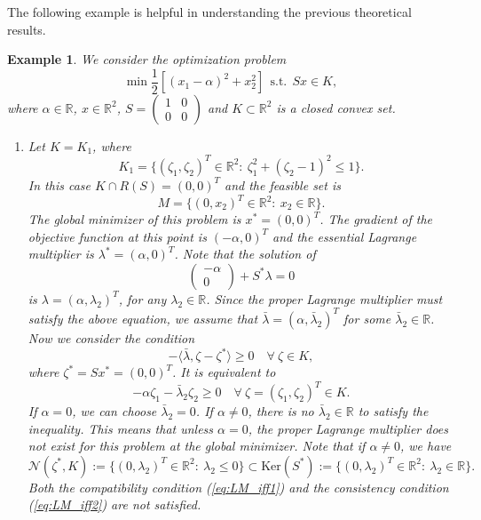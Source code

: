 \documentclass[leqno]{amsart}
\newtheorem{Example}[Theorem]{Example}
\theoremstyle{definition}
\begin{document}
The following example is helpful in understanding the previous theoretical results.
\begin{Example}\label{exm:Ex1}
We consider the optimization problem
\begin{equation}\nonumber
\min\frac{1}{2}[(x_1 -\alpha)^2 + x_2^2]\ \ \mbox{s.t.}\ \  Sx \in K,
\end{equation}
where $\alpha\in \mathbb{R}$, $x\in \mathbb{R}^{2}$, $S = \begin{pmatrix}1 & 0\\ 0 &0 \end{pmatrix}$ and $K\subset \mathbb{R}^2$ is a closed convex set.

\begin{enumerate}[$\bullet$]
\item Let $K = K_1$, where 
$$K_1 = \{(\zeta_1,\zeta_2)^T\in \mathbb{R}^2:\ \zeta_1^2 + (\zeta_2 -1)^2 \leq 1\}.$$
In this case $K\cap R(S) = (0,0)^T$ and the feasible set is 
$$ M = \{(0,x_2)^T\in \mathbb{R}^2:\ x_2\in \mathbb{R}\}. $$ 
The global minimizer of this problem is $x^* = (0,0)^T$. The gradient of the objective function at this point is $(-\alpha,0)^T$ and the essential Lagrange multiplier is $\lambda^* = (\alpha, 0)^T$. Note that the solution of
$$\begin{pmatrix}-\alpha \\0 \end{pmatrix} + S^*\lambda = 0$$
is $\lambda = (\alpha, \lambda_2)^T$, for any $\lambda_2\in \mathbb{R}$. Since the proper Lagrange multiplier must satisfy the above equation, we assume that $\bar{\lambda} = (\alpha, \bar{\lambda}_2)^T$ for some $\bar{\lambda}_2\in \mathbb{R}$. Now we consider the condition
$$- \langle \bar{\lambda}, \zeta - \zeta^*\rangle\geq 0\quad \forall\ \zeta\in K,$$
where $\zeta^* = Sx^* = (0,0)^T$.
It is equivalent to 
$$ -\alpha\zeta_1 - \bar{\lambda}_2 \zeta_2 \geq 0\quad \forall\ \zeta = (\zeta_1, \zeta_2)^T\in K.$$
If $\alpha = 0$, we can choose $\bar{\lambda}_2 = 0$.
If $\alpha \neq 0$, there is no $\bar{\lambda}_2\in \mathbb{R}$ to satisfy the inequality.  This means that unless $\alpha=0$, the proper Lagrange multiplier does not exist for this problem at the global minimizer. Note that if $\alpha \neq 0$, we have 
$$ \mathcal{N}(\zeta^*,K):=\{(0, \lambda_2)^T\in \mathbb{R}^2:\ \lambda_2\leq 0\} \subset \mathrm{Ker}(S^*) :=\{(0, \lambda_2)^T\in \mathbb{R}^2:\ \lambda_2\in \mathbb{R}\}.$$
Both the compatibility condition (\ref{eq:LM_iff1}) and the consistency condition (\ref{eq:LM_iff2}) are not satisfied.


\end{enumerate}
\end{Example}
\end{document}
